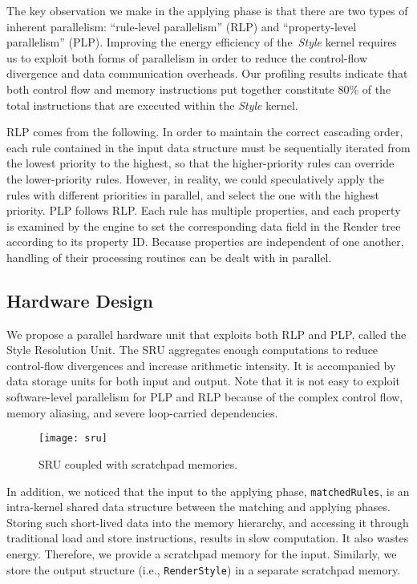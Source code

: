The key observation we make in the applying phase is that there are two types of inherent parallelism: ``rule-level parallelism'' (RLP) and ``property-level parallelism'' (PLP). Improving the energy efficiency of the~\textit{Style} kernel requires us to exploit both forms of parallelism in order to reduce the control-flow divergence and data communication overheads. Our profiling results indicate that both control flow and memory instructions put together constitute 80\% of the total instructions that are executed within the \textit{Style} kernel.

RLP comes from the following. In order to maintain the correct cascading order, each rule contained in the input data structure must be sequentially iterated from the lowest priority to the highest, so that the higher-priority rules can override the lower-priority rules. However, in reality, we could speculatively apply the rules with different priorities in parallel, and select the one with the highest priority. PLP follows RLP. Each rule has multiple properties, and each property is examined by the engine to set the corresponding data field in the Render tree according to its property ID. Because properties are independent of one another, handling of their processing routines can be dealt with in parallel.

\subsection{Hardware Design}
\label{sec:sru:hw}

We propose a parallel hardware unit that exploits both RLP and PLP, called the Style Resolution Unit. The SRU aggregates enough computations to reduce control-flow divergences and increase arithmetic intensity. It is accompanied by data storage units for both input and output. Note that it is not easy to exploit software-level parallelism for PLP and RLP because of the complex control flow, memory aliasing, and severe loop-carried dependencies.

\begin{figure}[t]
\centering
\texttt{[image: sru]}
\caption{\small{SRU coupled with scratchpad memories.}}
\label{fig:sru}
\end{figure}

In addition, we noticed that the input to the applying phase, \texttt{matchedRules}, is an intra-kernel shared data structure between the matching and applying phases. Storing such short-lived data into the memory hierarchy, and accessing it through traditional load and store instructions, results in slow computation. It also wastes energy. Therefore, we provide a scratchpad memory for the input. Similarly, we store the output structure (i.e., \texttt{RenderStyle}) in a separate scratchpad memory.

